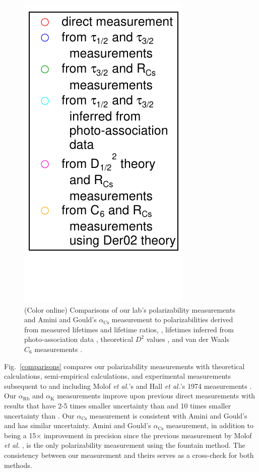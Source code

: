 \documentclass[twocolumn,prl,showpacs,superscriptaddress]{revtex4-1}   %
\newcommand{\figref}[1]{Fig.~\ref{#1}}
\newcommand{\ak}{\alpha_{\textrm{K}}}
\newcommand{\arb}{\alpha_{\textrm{Rb}}}
\newcommand{\acs}{\alpha_{\textrm{Cs}}}
\newcommand{\etal}{\textit{et al.}}
\newcommand{\etalspace}{\textit{et al. }}
\begin{document}
\begin{figure}
\includegraphics[width=0.365\linewidth,keepaspectratio,valign=t]{displayMiscLegend.pdf}
\caption{\label{comparisonsMisc}(Color online) Comparisons of our lab's polarizability measurements and Amini and Gould's $\acs$ measurement \cite{Amini2003} to polarizabilities derived from measured lifetimes and lifetime ratios,
\cite{Young1994,Rafac1999,Bouloufa2007,Falke2006a,Volz2006,Simsarian1998,Wang1997,Rafac1998}, 
lifetimes inferred from photo-association data
\cite{Gabbanini2000,Gutterres2002},
theoretical $D^2$ values
\cite{Porsev2010},
and van der Waals $C_6$ measurements
\cite{Leo2000,Chin2004,Derevianko2001}.}
\end{figure}

\figref{comparisons} compares our polarizability measurements with theoretical calculations, semi-empirical calculations, and experimental measurements subsequent to and including Molof \etal's and Hall \etal's 1974 measurements \cite{Molof1974a,Hall1974}. 
Our $\arb$ and $\ak$ measurements improve upon previous direct measurements with results that have 2-5 times smaller uncertainty than \cite{Holmgren2010} and 10 times smaller uncertainty than \cite{Molof1974a}. 
Our $\acs$ measurement is consistent with Amini and Gould's \cite{Amini2003} and has similar uncertainty.  
Amini and Gould's $\acs$ measurement, in addition to being a 15$\times$ improvement in precision since the previous measurement by Molof \etalspace \cite{Molof1974a}, is the only polarizability measurement using the fountain method. 
The consistency between our measurement and theirs serves as a cross-check for both methods.
\end{document}
